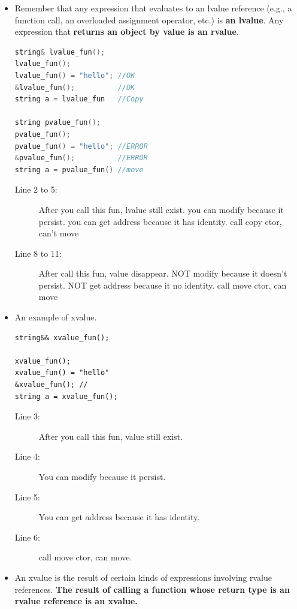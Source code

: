 \documentclass[a4paper,11pt,twoside]{book}
\begin{document}
\begin{itemize}
	
	\item Remember that any expression that evaluates to an lvalue reference (e.g., a function call, an overloaded assignment operator, etc.) is \textbf{an lvalue}. Any expression that \textbf{returns an object by value is an rvalue}.
	
\begin{lstlisting}[frame=single, language=c++, mathescape=true]
string& lvalue_fun();
lvalue_fun(); 
lvalue_fun() = "hello"; //OK
&lvalue_fun();          //OK
string a = lvalue_fun   //Copy

string pvalue_fun();
pvalue_fun(); 
pvalue_fun() = "hello"; //ERROR
&pvalue_fun();          //ERROR
string a = pvalue_fun() //move
\end{lstlisting}
\begin{description}
	\item[Line 2 to 5:] After you call this fun, lvalue still exist. you can modify because it persist. you can get address because it has identity. call copy ctor, can't move
	
	\item[Line 8 to 11:]  After call this fun, value disappear. NOT modify because it doesn't persist. NOT get address because it no identity. call move ctor, can move
\end{description}

\item An example of xvalue.
\begin{lstlisting}
string&& xvalue_fun();

xvalue_fun(); 
xvalue_fun() = "hello" 
&xvalue_fun(); //
string a = xvalue_fun(); 
\end{lstlisting}
\begin{description}
	\item[Line 3:] After you call this fun, value still exist.
	\item[Line 4:] You can modify because it persist.
	\item[Line 5:] You can get address because it has identity.
	\item[Line 6:] call move ctor, can move.
\end{description}

	\item An xvalue is the result of certain kinds of expressions involving rvalue references. \textbf{The result of calling a function whose return type is an rvalue reference is an xvalue.}
	

\end{itemize}
\end{document}
